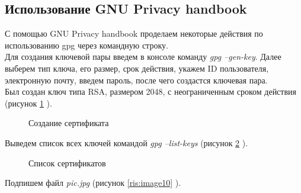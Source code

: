 \documentclass[10pt,a4paper]{report}
\begin{document}
\subsection{Использование GNU Privacy handbook}
С помощью GNU Privacy handbook проделаем некоторые действия по использованию gpg через командную строку. \\
Для создания ключевой пары введем в консоле команду \textit{gpg --gen-key}. Далее выберем тип ключа, его размер, срок действия, укажем ID пользователя, электронную почту, введем пароль, после чего создастся ключевая пара.\\
Был создан ключ типа RSA, размером 2048, с неограниченным сроком действия (рисунок \ref{ris:image8} ). \\
\pagebreak
\begin{figure}[h]	
\caption{Создание сертификата}
\label{ris:image8}
\end{figure}
 
Выведем список всех ключей командой \textit{gpg --list-keys} (рисунок \ref{ris:image9} ). \\
\begin{figure}[h]	
\caption{Список сертификатов}
\label{ris:image9}
\end{figure}
\pagebreak
Подпишем файл \textit{pic.jpg} (рисунок \ref{ris:image10} ). \\
\end{document}

